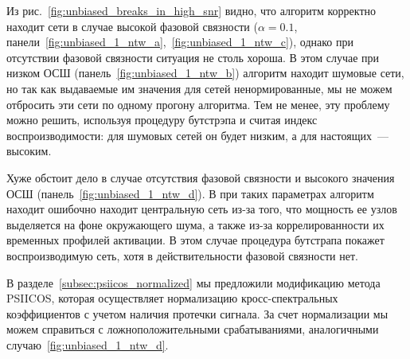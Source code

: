 Из рис.~\ref{fig:unbiased_breaks_in_high_snr} видно, что алгоритм корректно находит
сети в случае высокой фазовой связности ($\alpha=0.1$, панели~\ref{fig:unbiased_1_ntw_a},~\ref{fig:unbiased_1_ntw_c}), однако при отсутствии фазовой связности ситуация не столь хороша.
В этом случае при низком ОСШ (панель~\ref{fig:unbiased_1_ntw_b}) алгоритм находит
шумовые сети, но так как выдаваемые им значения для сетей ненормированные, мы не можем
отбросить эти сети по одному прогону алгоритма. Тем не менее, эту проблему можно
решить, используя процедуру бутстрэпа и считая индекс воспроизводимости: для шумовых сетей
он будет низким, а для настоящих~--- высоким.

Хуже обстоит дело в случае отсутствия фазовой связности и высокого значения ОСШ (панель~\ref{fig:unbiased_1_ntw_d}). В при таких параметрах алгоритм находит ошибочно находит центральную сеть
из-за того, что мощность ее узлов выделяется на фоне окружающего шума, а также из-за
коррелированности их временных профилей активации. В этом случае процедура бутстрапа
покажет воспроизводимую сеть, хотя в действительности фазовой связности нет.

В разделе~\ref{subsec:psiicos_normalized} мы предложили
модификацию метода PSIICOS, которая осуществляет нормализацию кросс-спектральных
коэффициентов с учетом наличия протечки сигнала. За счет нормализации мы можем справиться
с ложноположительными срабатываниями, аналогичными случаю~\ref{fig:unbiased_1_ntw_d}.

